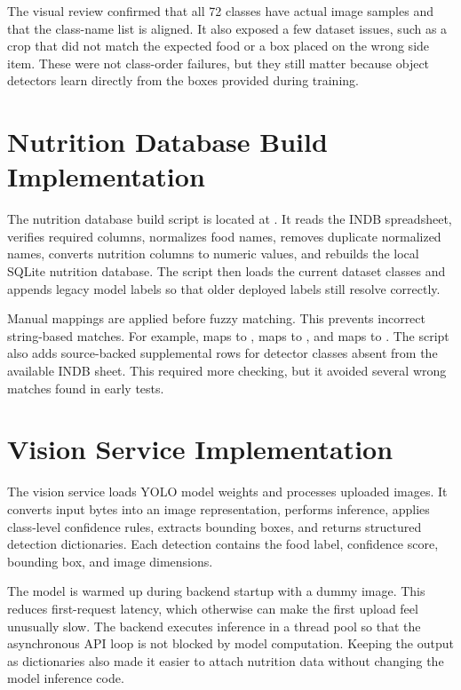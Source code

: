 The visual review confirmed that all 72 classes have actual image samples and that the class-name list is aligned. It also exposed a few dataset issues, such as a crop that did not match the expected food or a box placed on the wrong side item. These were not class-order failures, but they still matter because object detectors learn directly from the boxes provided during training.

\section{Nutrition Database Build Implementation}

The nutrition database build script is located at . It reads the INDB spreadsheet, verifies required columns, normalizes food names, removes duplicate normalized names, converts nutrition columns to numeric values, and rebuilds the local SQLite nutrition database. The script then loads the current dataset classes and appends legacy model labels so that older deployed labels still resolve correctly.

Manual mappings are applied before fuzzy matching. This prevents incorrect string-based matches. For example,  maps to ,  maps to , and  maps to . The script also adds source-backed supplemental rows for detector classes absent from the available INDB sheet. This required more checking, but it avoided several wrong matches found in early tests.

\section{Vision Service Implementation}

The vision service loads YOLO model weights and processes uploaded images. It converts input bytes into an image representation, performs inference, applies class-level confidence rules, extracts bounding boxes, and returns structured detection dictionaries. Each detection contains the food label, confidence score, bounding box, and image dimensions.

The model is warmed up during backend startup with a dummy image. This reduces first-request latency, which otherwise can make the first upload feel unusually slow. The backend executes inference in a thread pool so that the asynchronous API loop is not blocked by model computation. Keeping the output as dictionaries also made it easier to attach nutrition data without changing the model inference code.

